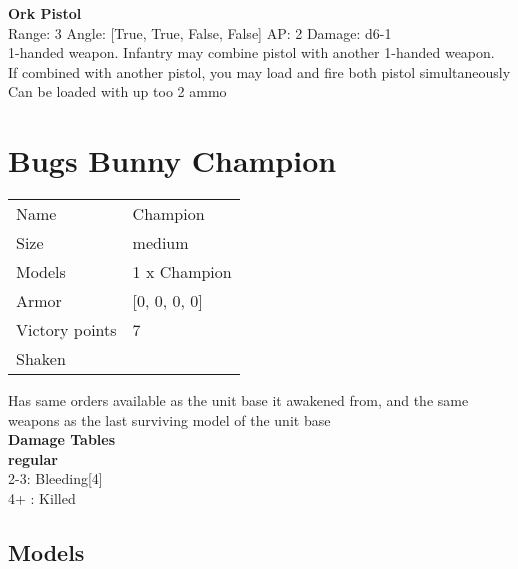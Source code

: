 {\bf Ork Pistol } \\



Range: 3  Angle: [True, True, False, False] AP: 2 Damage: d6-1 \\
1-handed weapon. Infantry may combine pistol with another 1-handed weapon.\\ 
If combined with another pistol, you may load and fire both pistol simultaneously\\ 
Can be loaded with up too 2 ammo\\ 




 















\clearpage

\section{ Bugs Bunny Champion }

\begin{tabular}{ll}
  Name & Champion \\
  Size & medium\\
  Models & 1 x Champion\\
  Armor & [0, 0, 0, 0]\\
  Victory points & 7\\
  Shaken & \\
\end{tabular}

Has same orders available as the unit base it awakened from, and the same weapons as the last surviving model of the unit base\\ 



{\bf Damage Tables} \\
 {\bf regular } \\
2-3: Bleeding[4] \\
4+ : Killed \\


\clearpage

\subsection{ Models }

